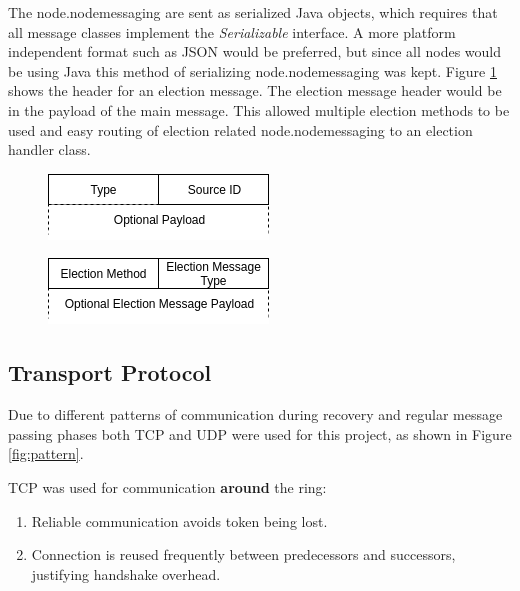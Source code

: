 \documentclass[12pt]{article}
\begin{document}
The node.nodemessaging are sent as serialized Java objects, which requires that all message classes implement the \emph{Serializable} interface. A more platform independent format such as JSON would be preferred, but since all nodes would be using Java this method of serializing node.nodemessaging was kept. Figure \ref{fig:elecmsg} shows the header for an election message. The election message header would be in the payload of the main message. This allowed multiple election methods to be used and easy routing of election related node.nodemessaging to an election handler class.

\begin{figure}[!ht]
\centering
\begin{minipage}{.5\textwidth}
  \centering
  \includegraphics[width=.8\linewidth]{images/mainmsg}
  \label{fig:mainmsg}
\end{minipage}%
\begin{minipage}{.5\textwidth}
  \centering
  \includegraphics[width=.8\linewidth]{images/elecmsg}
  \label{fig:elecmsg}
\end{minipage}
\end{figure}

\subsection{Transport Protocol}

Due to different patterns of communication during recovery and regular message passing phases both TCP and UDP were used for this project, as shown in Figure \ref{fig:pattern}.

\noindent \linebreak TCP was used for communication \textbf{around} the ring:
\begin{enumerate}
    \item Reliable communication avoids token being lost.
    \item Connection is reused frequently between predecessors and successors, justifying handshake overhead.
\end{enumerate}
\end{document}

